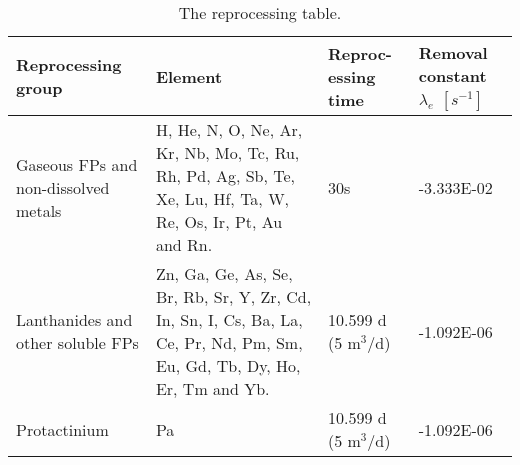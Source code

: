 \begin{table}[ht!]
	\centering
	\caption{The reprocessing table.} 
	\vspace{1ex}
	\begin{tabularx}{\textwidth}{|p{2.3cm}|p{4.5cm}|s|p{2cm}|}
			\hline
			\textbf{Reprocessing group}  & \textbf{Element} & \textbf{Reproc- essing time} & \textbf{Removal constant} $\lambda_{e}$ $[s^{-1}]$ \\
			\hline
			Gaseous \gls{FPs} and non-dissolved metals  &  H, He, N, O, Ne, Ar, Kr, Nb, Mo, Tc, Ru, Rh, Pd, Ag, Sb, Te, Xe, Lu, Hf, Ta, W, Re, Os, Ir, Pt, Au and Rn.		&	30s	&  -3.333E-02 \\
			\hline
			Lanthanides and other soluble \gls{FPs}     & 
			Zn, Ga, Ge, As, Se, Br, Rb, Sr, Y, Zr, Cd, In, Sn, I, Cs, Ba, La, Ce, Pr, Nd, Pm, Sm, Eu, Gd, Tb, Dy, Ho, Er, Tm and Yb. & 10.599 d (5 m$^3$/d) &  -1.092E-06 \\
			\hline
			Protactinium   & Pa  &  10.599 d (5 m$^3$/d)  &  -1.092E-06 \\
			\hline
	\end{tabularx}
	\label{tab:table6}
\end{table}

